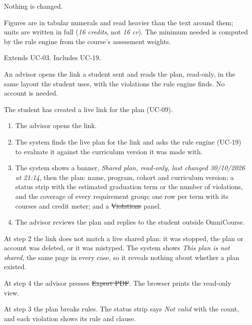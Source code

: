 Nothing is changed.

Figures are in tabular numerals and read heavier than the text around them; units are written in full (\emph{16 credits},
not \emph{16 cr}). The minimum needed is computed by the rule engine from the course's assessment weights.

Extends UC-03. Includes UC-19.


An advisor opens the link a student sent and reads the plan, read-only, in the same layout the student uses, with the
violations the rule engine finds. No account is needed.

The student has created a live link for the plan (UC-09).

\begin{enumerate}
  \item The advisor opens the link.
  \item The system finds the live plan for the link and asks the rule engine (UC-19) to evaluate it against the curriculum
        version it was made with.
  \item The system shows a banner, \emph{Shared plan, read-only, last changed 30/10/2026 at 21:14}, then the plan: name,
        program, cohort and curriculum version; a status strip with the estimated graduation term or the number of
        violations, and the coverage of every requirement group; one row per term with its courses and credit meter; and
        a \st{Violations} panel.
  \item The advisor reviews the plan and replies to the student outside OmniCourse.
\end{enumerate}

\begin{altflows}
  \item[A1. Dead or unknown link.] At step 2 the link does not match a live shared plan: it was stopped, the plan or
        account was deleted, or it was mistyped. The system shows \emph{This plan is not shared}, the same page in every
        case, so it reveals nothing about whether a plan existed.
  \item[A2. Print.] At step 4 the advisor presses \st{Export PDF}. The browser prints the read-only view.
  \item[A3. Plan has violations.] At step 3 the plan breaks rules. The status strip says \emph{Not valid} with the count,
        and each violation shows its rule and clause.
\end{altflows}

